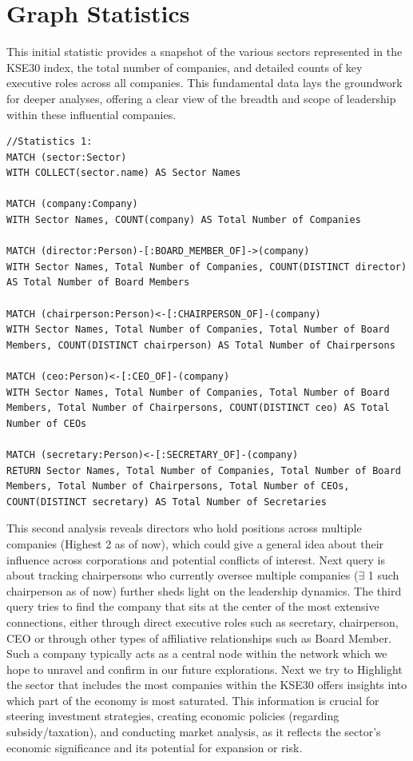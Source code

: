 \documentclass[12pt]{article}
\begin{document}
\section{Graph Statistics}
This initial statistic provides a snapshot of the various sectors represented in the KSE30 index, the total number of companies, and detailed counts of key executive roles across all companies. This fundamental data lays the groundwork for deeper analyses, offering a clear view of the breadth and scope of leadership within these influential companies. 
\begin{lstlisting}[frame=single]
    //Statistics 1:
MATCH (sector:Sector)
WITH COLLECT(sector.name) AS Sector Names

MATCH (company:Company)
WITH Sector Names, COUNT(company) AS Total Number of Companies

MATCH (director:Person)-[:BOARD_MEMBER_OF]->(company)
WITH Sector Names, Total Number of Companies, COUNT(DISTINCT director) AS Total Number of Board Members

MATCH (chairperson:Person)<-[:CHAIRPERSON_OF]-(company)
WITH Sector Names, Total Number of Companies, Total Number of Board Members, COUNT(DISTINCT chairperson) AS Total Number of Chairpersons

MATCH (ceo:Person)<-[:CEO_OF]-(company)
WITH Sector Names, Total Number of Companies, Total Number of Board Members, Total Number of Chairpersons, COUNT(DISTINCT ceo) AS Total Number of CEOs

MATCH (secretary:Person)<-[:SECRETARY_OF]-(company)
RETURN Sector Names, Total Number of Companies, Total Number of Board Members, Total Number of Chairpersons, Total Number of CEOs, COUNT(DISTINCT secretary) AS Total Number of Secretaries

\end{lstlisting}
This second analysis reveals directors who hold positions across multiple companies (Highest 2 as of now), which could give a general idea about their influence across corporations and potential conflicts of interest. Next query is about tracking chairpersons who currently oversee multiple companies ($\exists$ 1 such chairperson as of now) further sheds light on the leadership dynamics. The third query tries to find the company that sits at the center of the most extensive connections, either through direct executive roles such as secretary, chairperson, CEO or through other types of affiliative relationships such as Board Member. Such a company typically acts as a central node within the network which we hope to unravel and confirm in our future explorations.
Next we try to Highlight the sector that includes the most companies within the KSE30 offers insights into which part of the economy is most saturated. This information is crucial for steering investment strategies, creating economic policies (regarding subsidy/taxation), and conducting market analysis, as it reflects the sector's economic significance and its potential for expansion or risk.
\end{document}
